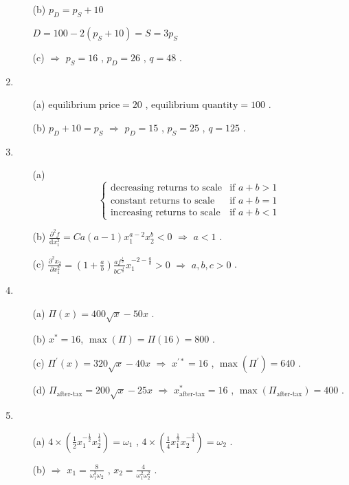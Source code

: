 \documentclass{article}
\begin{document}
\begin{enumerate}
\begin{enumerate}
        \item[(b)] $p_D=p_S+10$ \par
        $D=100-2(p_S+10)=S=3p_S$
        \item[(c)] $\Rightarrow$ $p_S=16$ , $p_D=26$ , $q=48$ .
    \end{enumerate}
    \item \begin{enumerate}
        \item[(a)] $\text{equilibrium price}=20$ , $\text{equilibrium quantity}=100$ .
        \item[(b)] $p_D+10=p_S$ $\Rightarrow$ $p_D=15$ , $p_S=25$ , $q=125$ .
    \end{enumerate}
    \item \begin{enumerate}
        \item[(a)] \begin{equation}
            \begin{cases}
                \text{decreasing returns to scale} & \text{if } a+b>1 \\
                \text{constant returns to scale} & \text{if } a+b=1 \\
                \text{increasing returns to scale} & \text{if } a+b<1
            \end{cases}
        \end{equation}
        \item[(b)] $\frac{\partial^2f}{\mathrm{d}x_1^2}=Ca(a-1)x_1^{a-2}x_2^b<0$ $\Rightarrow$ $a<1$ .
        \item[(c)] $\frac{\partial^2x_2}{\partial x_1^2}=(1+\frac{a}{b})\frac{af^{\frac{1}{b}}}{bC^{\frac{1}{b}}}x_1^{-2-\frac{a}{b}}>0$ $\Rightarrow$ $a,b,c>0$ .
    \end{enumerate}
    \item \begin{enumerate}
        \item[(a)] $\Pi(x)=400\sqrt{x}-50x$ .
        \item[(b)] $x^{*}=16$, $\max(\Pi)=\Pi(16)=800$ .
        \item[(c)] $\Pi^{'}(x)=320\sqrt{x}-40x$ $\Rightarrow$ $x^{'*}=16$ , $\max(\Pi^{'})=640$ .
        \item[(d)] $\Pi_{\text{after-tax}}=200\sqrt{x}-25x$ $\Rightarrow$ $x_{\text{after-tax}}^{*}=16$ , $\max(\Pi_{\text{after-tax}})=400$ .
    \end{enumerate}
    \item \begin{enumerate}
        \item[(a)] $4\times(\frac{1}{2}x_1^{-\frac{1}{2}}x_2^{\frac{1}{4}})=\omega_1$ , $4\times(\frac{1}{4}x_1^{\frac{1}{2}}x_2^{-\frac{3}{4}})=\omega_2$ .
        \item[(b)] $\Rightarrow$ $x_1=\frac{8}{\omega_1^3\omega_2}$ , $x_2=\frac{4}{\omega_1^2\omega_2^2}$ .
    \end{enumerate}
\end{enumerate}
\end{document}
